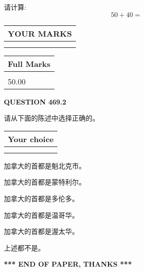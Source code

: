 \documentclass{ctexart}
\begin{document}
  
 
请计算:
\begin{equation}
50 +  %
40 = \nonumber
\end{equation}
 

 

 
  
\vspace{0.2in}
  
\noindent\begin{tabular}{|l|}
\hline
 YOUR MARKS  \\
\hline
 \\ 
 \\ 
\hline
\end{tabular}
\hspace{0.05in} \begin{tabular}{|l|}
\hline
 Full Marks  \\
\hline
 \\ 
50.00 \\
\hline
\end{tabular}
{\textbf{\Large{QUESTION
469.2 
}}}
  
  
请从下面的陈述中选择正确的。
  
  
\noindent\hspace{3.0in} \begin{tabular}{|l|}
\hline
Your choice \\
\hline
 \\ 
 \\ 
\hline
\end{tabular}
  
  
 
 
加拿大的首都是魁北克市。
 
 
加拿大的首都是蒙特利尔。
 
 
加拿大的首都是多伦多。
 
 
加拿大的首都是温哥华。
 
 
加拿大的首都是渥太华。
 
 
 上述都不是。
 
 
   
   
 \vspace{0.2in}
 
   
   
   
   
\vspace{1.0in} 
{\textbf{\large{ *** END OF PAPER, THANKS *** }}} 
   
\end{document}
